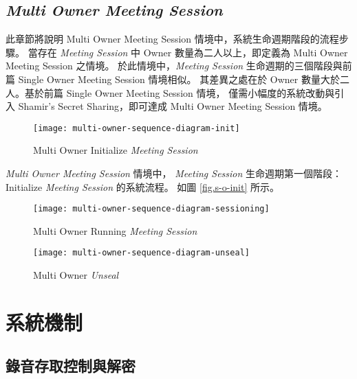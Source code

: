 \subsection{{\it Multi Owner Meeting Session}}

此章節將說明 Multi Owner Meeting Session 情境中，系統生命週期階段的流程步驟。
當存在 {\it Meeting Session} 中 Owner 數量為二人以上，即定義為 Multi Owner Meeting Session 之情境。
於此情境中，{\it Meeting Session} 生命週期的三個階段與前篇 Single Owner Meeting Session 情境相似。
其差異之處在於 Owner 數量大於二人。基於前篇 Single Owner Meeting Session 情境，
僅需小幅度的系統改動與引入 Shamir's Secret Sharing，即可達成 Multi Owner Meeting Session 情境。

\begin{figure}[H]
    \centering
    \texttt{[image: multi-owner-sequence-diagram-init]}
    \caption{Multi Owner Initialize {\it Meeting Session}}
    \label{fig.m-o-init}
\end{figure}

    {\it Multi Owner Meeting Session} 情境中，
{\it Meeting Session} 生命週期第一個階段：Initialize {\it Meeting Session} 的系統流程。
如圖 \ref{fig.s-o-init} 所示。

\begin{figure}[H]
    \centering
    \texttt{[image: multi-owner-sequence-diagram-sessioning]}
    \caption{Multi Owner Running {\it Meeting Session}}
    \label{fig.m-o-sessioning}
\end{figure}

\begin{figure}[H]
    \centering
    \texttt{[image: multi-owner-sequence-diagram-unseal]}
    \caption{Multi Owner {\it Unseal}}
    \label{fig.m-o-unseal}
\end{figure}


\section{系統機制}

\subsection{錄音存取控制與解密}

